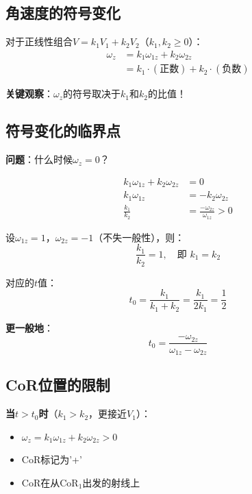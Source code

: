 \documentclass[12pt,a4paper]{article}
\begin{document}
\subsection{角速度的符号变化}

对于正线性组合$V = k_1 V_1 + k_2 V_2$（$k_1, k_2 \geq 0$）：
\begin{align}
\omega_z &= k_1 \omega_{1z} + k_2 \omega_{2z} \\
&= k_1 \cdot (\text{正数}) + k_2 \cdot (\text{负数})
\end{align}

\textbf{关键观察}：$\omega_z$的符号取决于$k_1$和$k_2$的比值！

\subsection{符号变化的临界点}

\textbf{问题}：什么时候$\omega_z = 0$？

\begin{align}
k_1 \omega_{1z} + k_2 \omega_{2z} &= 0 \\
k_1 \omega_{1z} &= -k_2 \omega_{2z} \\
\frac{k_1}{k_2} &= \frac{-\omega_{2z}}{\omega_{1z}} > 0
\end{align}

设$\omega_{1z} = 1$，$\omega_{2z} = -1$（不失一般性），则：
\begin{equation}
\frac{k_1}{k_2} = 1, \quad \text{即 } k_1 = k_2
\end{equation}

对应的$t$值：
\begin{equation}
t_0 = \frac{k_1}{k_1 + k_2} = \frac{k_1}{2k_1} = \frac{1}{2}
\end{equation}

\textbf{更一般地}：
\begin{equation}
t_0 = \frac{-\omega_{2z}}{\omega_{1z} - \omega_{2z}}
\end{equation}

\subsection{CoR位置的限制}

\textbf{当$t > t_0$时}（$k_1 > k_2$，更接近$V_1$）：
\begin{itemize}
\item $\omega_z = k_1 \omega_{1z} + k_2 \omega_{2z} > 0$
\item CoR标记为'+'
\item CoR在从CoR$_1$出发的射线上
\end{itemize}
\end{document}
